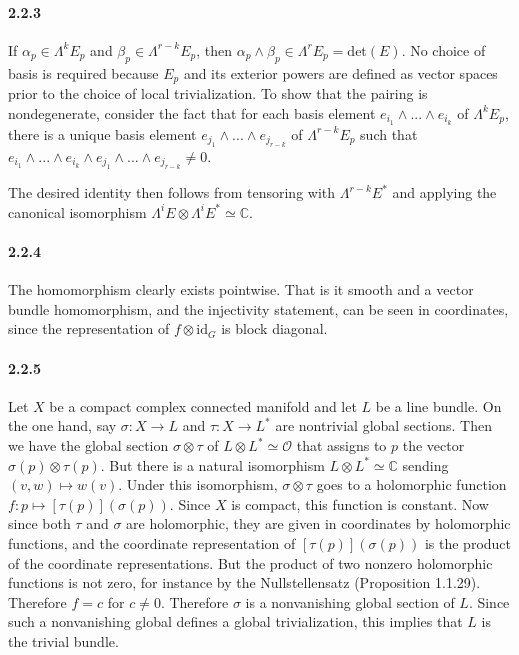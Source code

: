 \documentclass[10pt,letter]{article}
\begin{document}
\paragraph*{2.2.3} If $\alpha_p \in \Lambda^k E_p$ and $\beta_p \in \Lambda^{r-k} E_p$, then $\alpha_p \wedge \beta_p \in \Lambda^r E_p = \text{det}(E)$. No choice of basis is required because $E_p$ and its exterior powers are defined as vector spaces prior to the choice of local trivialization. To show that the pairing is nondegenerate, consider the fact that for each basis element $e_{i_1} \wedge ... \wedge e_{i_k}$ of $\Lambda^k E_p$, there is a unique basis element $e_{j_1} \wedge ... \wedge e_{j_{r-k}}$ of $\Lambda^{r-k} E_p$ such that $e_{i_1} \wedge ... \wedge e_{i_k} \wedge e_{j_1} \wedge ... \wedge e_{j_{r-k}}  \neq 0$. 

The desired identity then follows from tensoring with $\Lambda^{r-k} E^{\ast}$ and applying the canonical isomorphism $\Lambda^i E \otimes \Lambda^i E^{\ast} \simeq \mathbb{C}$. 

\paragraph*{2.2.4} The homomorphism clearly exists pointwise. That is it smooth and a vector bundle homomorphism, and the injectivity statement, can be seen in coordinates, since the representation of $f \otimes \text{id}_G$ is block diagonal. 

\paragraph*{2.2.5} Let $X$ be a compact complex connected manifold and let $L$ be a line bundle. On the one hand, say $\sigma: X \rightarrow L$ and $\tau: X \rightarrow L^{\ast}$ are nontrivial global sections. Then we have the global section $\sigma \otimes \tau$ of $L \otimes L^{\ast} \simeq \mathcal{O}$ that assigns to $p$ the vector $\sigma(p) \otimes \tau(p)$. But there is a natural isomorphism $L \otimes L^{\ast} \simeq \mathbb{C}$ sending $(v,w) \mapsto w(v)$. Under this isomorphism, $\sigma \otimes \tau$ goes to a holomorphic function $f: p \mapsto [\tau(p)](\sigma(p))$. Since $X$ is compact, this function is constant. Now since both $\tau$ and $\sigma$ are holomorphic, they are given in coordinates by holomorphic functions, and the coordinate representation of $[\tau(p)](\sigma(p))$ is the product of the coordinate representations. But the product of two nonzero holomorphic functions is not zero, for instance by the Nullstellensatz (Proposition 1.1.29). Therefore $f = c$ for $c \neq 0$. Therefore $\sigma$ is a nonvanishing global section of $L$. Since such a nonvanishing global defines a global trivialization, this implies that $L$ is the trivial bundle.
\end{document}
